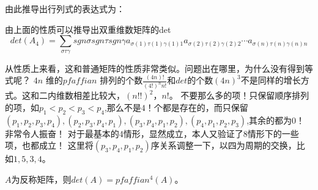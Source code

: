 \documentclass[twoside,a4paper,CCT]{cctart}   %
\begin{document}
由此推导出行列式的表达式为：

\begin{theorem} 由上面的性质可以推导出双重维数矩阵的det
$$det(A_{4})=\sum \limits_{\sigma\tau\gamma}sgn\sigma sgn\tau sgn\gamma a_{\sigma(1)\tau(1)\gamma(1)1} a_{\sigma(2)\tau(2)\gamma(2)2}\cdots a_{\sigma(n)\tau(n)\gamma(n)n}$$
\end{theorem}

从性质上来看，这和普通矩阵的性质非常类似。问题出在哪里，为什么没有得到等式呢？
$4n$ 维的$pfaffian$ 排列的个数$\frac{(4n)!}{(4!)^{n}n!}$和$det$的个数$(4n)^{3}$不是同样的增长方式。这和二内维数相差比较大，$(n!!)^2，n!$。
不要那么多的项！只保留顺序排列的项，如$p_{1}<p_{2}<p_{3}<p_{4}$,那么不是$4！$个都是存在的，而只保留$(p_{1},p_{2},p_{3},p_{4}),(p_{2},p_{3},p_{4},p_{1}),
(p_{3},p_{4},p_{1},p_{2}),(p_{4},p_{1},p_{2},p_{3})$,其余的都为0！
非常令人振奋！
对于最基本的4情形，显然成立，本人又验证了8情形下的一些项，也都成立！
这里将$(p_{3},p_{4},p_{1},p_{2})$序关系调整一下，以四为周期的交换，比如$1,5,3,4$。
\begin{guess}
$A$为反称矩阵，则$det(A)=pfaffian^{4}(A)$。
\end{guess}
\end{document}
